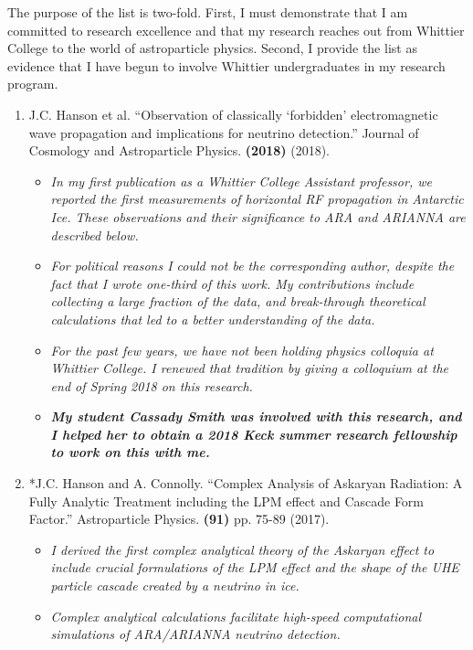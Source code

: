\documentclass[../../main.tex]{subfiles}
\begin{document}
The purpose of the list is two-fold.  First, I must demonstrate that I am committed to research excellence and that my research reaches out from Whittier College to the world of astroparticle physics.  Second, I provide the list as evidence that I have begun to involve Whittier undergraduates in my research program. \\ \hspace{0.1cm}

\begin{enumerate}
\item J.C. Hanson et al. ``Observation of classically ‘forbidden’ electromagnetic wave propagation and implications for neutrino detection.'' Journal of Cosmology and Astroparticle Physics. \textbf{(2018)} (2018).
\begin{itemize}
\item \textit{In my first publication as a Whittier College Assistant professor, we reported the first measurements of horizontal RF propagation in Antarctic Ice.  These observations and their significance to ARA and ARIANNA are described below.}
\item \textit{For political reasons I could not be the corresponding author, despite the fact that I wrote one-third of this work.  My contributions include collecting a large fraction of the data, and break-through theoretical calculations that led to a better understanding of the data.}
\item \textit{For the past few years, we have not been holding physics colloquia at Whittier College.  I renewed that tradition by giving a colloquium at the end of Spring 2018 on this research.}
\item \textit{\textbf{My student Cassady Smith was involved with this research, and I helped her to obtain a 2018 Keck summer research fellowship to work on this with me.}}
\end{itemize}
\item *J.C. Hanson and A. Connolly. ``Complex Analysis of Askaryan Radiation: A Fully Analytic Treatment including the LPM effect and Cascade Form Factor.'' Astroparticle Physics. \textbf{(91)} pp. 75-89 (2017).
\begin{itemize}
\item \textit{I derived the first complex analytical theory of the Askaryan effect to include crucial formulations of the LPM effect and the shape of the UHE particle cascade created by a neutrino in ice.}
\item \textit{Complex analytical calculations facilitate high-speed computational simulations of ARA/ARIANNA neutrino detection.}

\end{itemize}
\end{enumerate}
\end{document}
